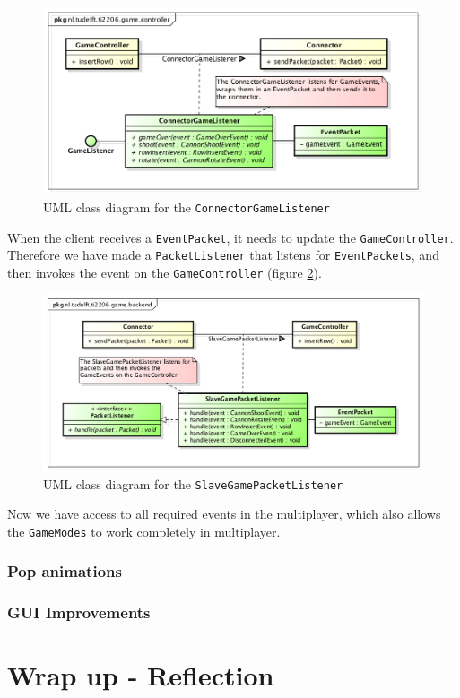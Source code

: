 \documentclass[a4paper]{article}
\begin{document}
\begin{figure}[H]
	\centering
	\includegraphics[scale=0.5]{ConnectorGameListenerExtended.png}
    \caption{UML class diagram for the \texttt{ConnectorGameListener} }
    \label{fig:connectorgamelistener}
\end{figure}

When the client receives a \texttt{EventPacket}, it needs to update the \texttt{GameController}. Therefore we have made a \texttt{PacketListener} that listens for \texttt{EventPackets}, and then invokes the event on the \texttt{GameController} (figure \ref{fig:slavegamepacketlistener}).

\begin{figure}[H]
	\centering
	\includegraphics[scale=0.5]{SlaveGamePacketListener.png}
    \caption{UML class diagram for the \texttt{SlaveGamePacketListener} }
    \label{fig:slavegamepacketlistener}
\end{figure}

Now we have access to all required events in the multiplayer, which also allows the \texttt{GameModes} to work completely in multiplayer.


\subsubsection{Pop animations}

\subsubsection{GUI Improvements}

\section{Wrap up - Reflection}

\end{document}
